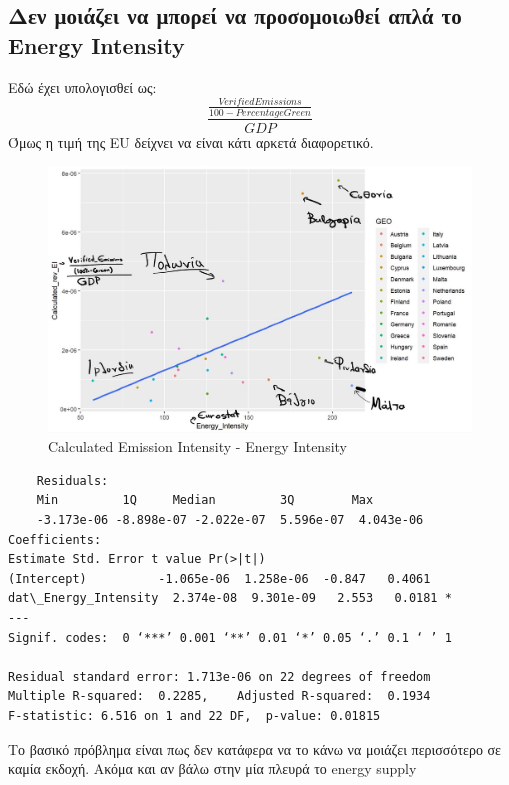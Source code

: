 \documentclass[a4paper,twoside,10pt]{article}
\begin{document}
\subsection{Δεν μοιάζει να μπορεί να προσομοιωθεί απλά το Energy Intensity}
Εδώ έχει υπολογισθεί ως:
$$\frac{\frac{VerifiedEmissions}{100 - PercentageGreen}}{GDP}$$
Όμως η τιμή της EU δείχνει να είναι κάτι αρκετά διαφορετικό. 
\begin{figure} [H]
	\centering
	\includegraphics[width=0.7\linewidth]{images/346111264_237886352220554_6402134938597733881_n}
	\caption{Calculated Emission Intensity - Energy Intensity}
	\label{fig:3461112642378863522205546402134938597733881n}
\end{figure}


\begin{verbatim}
	Residuals:
	Min         1Q     Median         3Q        Max 
	-3.173e-06 -8.898e-07 -2.022e-07  5.596e-07  4.043e-06 
Coefficients:
Estimate Std. Error t value Pr(>|t|)  
(Intercept)          -1.065e-06  1.258e-06  -0.847   0.4061  
dat\_Energy_Intensity  2.374e-08  9.301e-09   2.553   0.0181 *
---
Signif. codes:  0 ‘***’ 0.001 ‘**’ 0.01 ‘*’ 0.05 ‘.’ 0.1 ‘ ’ 1

Residual standard error: 1.713e-06 on 22 degrees of freedom
Multiple R-squared:  0.2285,	Adjusted R-squared:  0.1934 
F-statistic: 6.516 on 1 and 22 DF,  p-value: 0.01815
\end{verbatim}
Το βασικό πρόβλημα είναι πως δεν κατάφερα να το κάνω να μοιάζει περισσότερο σε καμία εκδοχή. Ακόμα και αν βάλω στην μία πλευρά το energy supply
\end{document}
